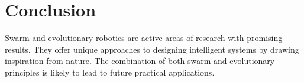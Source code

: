 \section{Conclusion}
Swarm and evolutionary robotics are active areas of research with promising results. They offer unique approaches to designing intelligent systems by drawing inspiration from nature. The combination of both swarm and evolutionary principles is likely to lead to future practical applications.
